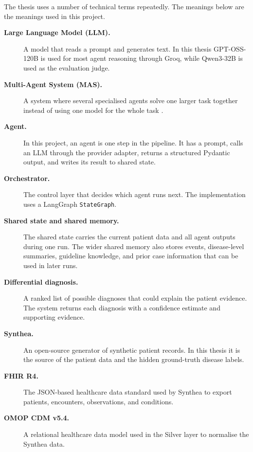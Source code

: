 The thesis uses a number of technical terms repeatedly. The meanings below are
the meanings used in this project.

\begin{description}

  \item[\textbf{Large Language Model (LLM).}] A model that reads a prompt and
    generates text. In this thesis GPT-OSS-120B is used for most agent reasoning
    through Groq, while Qwen3-32B is used as the evaluation judge.

  \item[\textbf{Multi-Agent System (MAS).}] A system where several specialised
    agents solve one larger task together instead of using one model for the
    whole task \cite{Kim2024MDAgents}.

  \item[\textbf{Agent.}] In this project, an agent is one step in the pipeline.
    It has a prompt, calls an LLM through the provider adapter, returns a
    structured Pydantic output, and writes its result to shared state.

  \item[\textbf{Orchestrator.}] The control layer that decides which agent runs
    next. The implementation uses a LangGraph \texttt{StateGraph}.

  \item[\textbf{Shared state and shared memory.}] The shared state carries the
    current patient data and all agent outputs during one run. The wider shared
    memory also stores events, disease-level summaries, guideline knowledge, and
    prior case information that can be used in later runs.

  \item[\textbf{Differential diagnosis.}] A ranked list of possible diagnoses
    that could explain the patient evidence. The system returns each diagnosis
    with a confidence estimate and supporting evidence.

  \item[\textbf{Synthea.}] An open-source generator of synthetic patient records.
    In this thesis it is the source of the patient data and the hidden
    ground-truth disease labels.

  \item[\textbf{FHIR R4.}] The JSON-based healthcare data standard used by
    Synthea to export patients, encounters, observations, and conditions.

  \item[\textbf{OMOP CDM v5.4.}] A relational healthcare data model used in the
    Silver layer to normalise the Synthea data.


\end{description}
